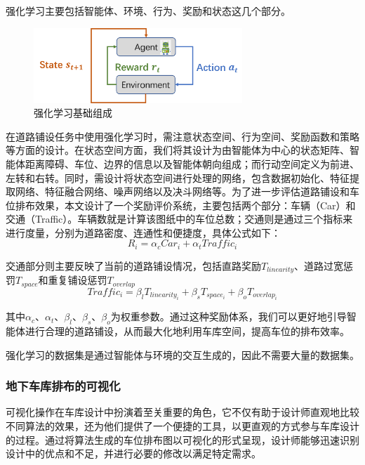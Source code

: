 强化学习主要包括智能体、环境、行为、奖励和状态这几个部分。
\begin{figure}[H]
  \centering
  \includegraphics[width=0.7\textwidth]{pictures/强化学习.png}
  \caption{强化学习基础组成}
  \label{fig:reinforcement_learning_component}
\end{figure}
在道路铺设任务中使用强化学习时，需注意状态空间、行为空间、奖励函数和策略等方面的设计。在状态空间方面，我们将其设计为由智能体为中心的状态矩阵、智能体距离障碍、车位、边界的信息以及智能体朝向组成；而行动空间定义为前进、左转和右转。同时，需设计将状态空间进行处理的网络，包含数据初始化、特征提取网络、特征融合网络、噪声网络以及决斗网络等。为了进一步评估道路铺设和车位排布效果，本文设计了一个奖励评价系统，主要包括两个部分：车辆（Car）和交通（Traffic）\cite{zheng2023spatial}。车辆数就是计算该图纸中的车位总数；交通则是通过三个指标来进行度量，分别为道路密度、连通性和便捷度，具体公式如下：
\begin{equation}
  \label{reward}
  R_i = \alpha_c Car_i + \alpha_t Traffic_i
\end{equation}

交通部分则主要反映了当前的道路铺设情况，包括直路奖励$T_{linearity}$、道路过宽惩罚$T_{space}$和重复铺设惩罚$T_{overlap}$
\begin{equation}
    Traffic_i = \beta_l T_{linearity_i} + \beta_s T_{space_i} + \beta_o T_{overlap_i}
\end{equation}

其中$\alpha_c$、$\alpha_t$、$\beta_l$、$\beta_s$、$\beta_o$为权重参数。通过这种奖励体系，我们可以更好地引导智能体进行合理的道路铺设，从而最大化地利用车库空间，提高车位的排布效率。

强化学习的数据集是通过智能体与环境的交互生成的，因此不需要大量的数据集。

\subsubsection{地下车库排布的可视化}
可视化操作在车库设计中扮演着至关重要的角色，它不仅有助于设计师直观地比较不同算法的效果，还为他们提供了一个便捷的工具，以更直观的方式参与车库设计的过程。通过将算法生成的车位排布图以可视化的形式呈现，设计师能够迅速识别设计中的优点和不足，并进行必要的修改以满足特定需求。

